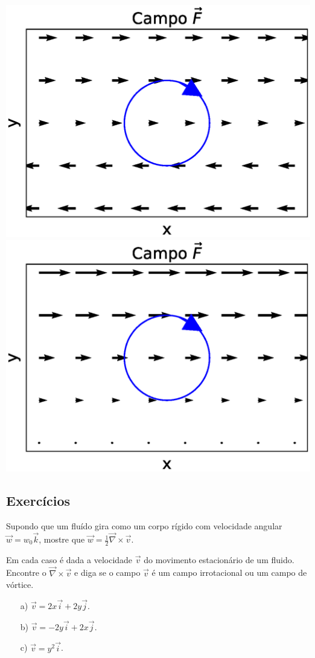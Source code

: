 \begin{center}\includegraphics[width=.5\textwidth]{cap_campos/figs/campo_com_bolinha_rotacional_1}\includegraphics[width=.5\textwidth]{cap_campos/figs/campo_com_bolinha_rotacional_2}\end{center}





\subsection*{Exercícios}
\begin{exer}
Supondo que um fluído gira como um corpo rígido com velocidade angular $\vec{w}=w_0\vec{k}$, mostre que $\vec{w}=\frac{1}{2}\vec{\nabla}\times \vec{v}$.
\end{exer}

\begin{exer}
Em cada caso é dada a velocidade $\vec{v}$ do movimento estacionário de um fluido. Encontre o $\vec{\nabla}\times\vec{v}$ e diga se o campo $\vec{v}$ é um campo irrotacional ou um campo de vórtice.
\begin{itemize}
 \item[a)] $\vec{v}=2x\vec{i}+2y\vec{j}$.
 \item[b)] $\vec{v}=-2y\vec{i}+2x\vec{j}$.
 \item[c)] $\vec{v}=y^2\vec{i}$.
 \end{itemize}

\end{exer}



